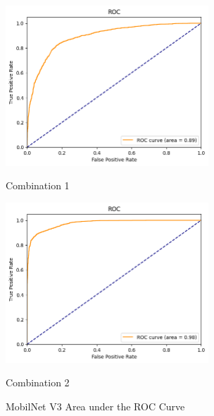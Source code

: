 \begin{figure}[H]
    \centering
    \begin{minipage}[b]{0.49\textwidth}
        \centering
        \includegraphics[width=\textwidth, height=6cm]{Figures/balanced_data/more_data/withoutbn/mn3/roc.png}
        \captionsetup{labelformat=empty}
        \caption{Combination 1}
        \label{fig:u_wo_r_roc}
    \end{minipage}
    \hfill
    \begin{minipage}[b]{0.49\textwidth}
        \centering
        \includegraphics[width=\textwidth, height=6cm]{Figures/balanced_data/more_data/withbn/mn3/roc.png}
        \captionsetup{labelformat=empty}
        \caption{Combination 2}
        \label{fig:u_w_r_roc}
    \end{minipage}
    \captionsetup{labelformat=default}
    \caption{MobilNet V3 Area under the ROC Curve}
\end{figure}